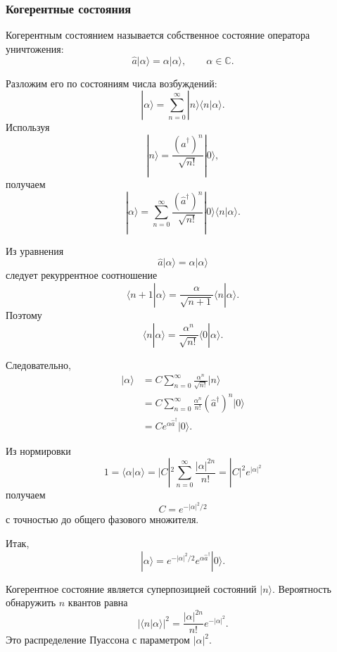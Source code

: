 \documentclass[12pt,a4paper]{article}
\begin{document}
\subsubsection{Когерентные состояния}

Когерентным состоянием называется собственное состояние оператора
уничтожения:
\[
    \boxed{
        \hat a|\alpha\rangle
        =
        \alpha|\alpha\rangle
    },
    \qquad
    \alpha\in\mathbb C.
\]

Разложим его по состояниям числа возбуждений:
\[
    |\alpha\rangle
    =
    \sum_{n=0}^{\infty}
        |n\rangle\langle n|\alpha\rangle.
\]
Используя
\[
    |n\rangle
    =
    \frac{(\hat a^\dagger)^n}{\sqrt{n!}}|0\rangle,
\]
получаем
\[
    |\alpha\rangle
    =
    \sum_{n=0}^{\infty}
    \frac{(\hat a^\dagger)^n}{\sqrt{n!}}
    |0\rangle
    \langle n|\alpha\rangle.
\]

Из уравнения
\[
    \hat a|\alpha\rangle
    =
    \alpha|\alpha\rangle
\]
следует рекуррентное соотношение
\[
    \boxed{
        \langle n+1|\alpha\rangle
        =
        \frac{\alpha}{\sqrt{n+1}}
        \langle n|\alpha\rangle
    }.
\]
Поэтому
\[
    \boxed{
        \langle n|\alpha\rangle
        =
        \frac{\alpha^n}{\sqrt{n!}}
        \langle0|\alpha\rangle
    }.
\]

Следовательно,
\begin{align*}
    |\alpha\rangle
    &=
    C
    \sum_{n=0}^{\infty}
        \frac{\alpha^n}{\sqrt{n!}}
        |n\rangle
    \\
    &=
    C
    \sum_{n=0}^{\infty}
        \frac{\alpha^n}{n!}
        (\hat a^\dagger)^n|0\rangle
    \\
    &=
    C
    e^{\alpha\hat a^\dagger}
    |0\rangle.
\end{align*}

Из нормировки
\[
    1
    =
    \langle\alpha|\alpha\rangle
    =
    |C|^2
    \sum_{n=0}^{\infty}
        \frac{|\alpha|^{2n}}{n!}
    =
    |C|^2e^{|\alpha|^2}
\]
получаем
\[
    C=e^{-|\alpha|^2/2}
\]
с точностью до общего фазового множителя.

Итак,
\[
    \boxed{
        |\alpha\rangle
        =
        e^{-|\alpha|^2/2}
        e^{\alpha\hat a^\dagger}
        |0\rangle
    }.
\]

Когерентное состояние является суперпозицией состояний
$|n\rangle$. Вероятность обнаружить $n$ квантов равна
\[
    \boxed{
        |\langle n|\alpha\rangle|^2
        =
        \frac{|\alpha|^{2n}}{n!}
        e^{-|\alpha|^2}
    }.
\]
Это распределение Пуассона с параметром $|\alpha|^2$.
\end{document}
